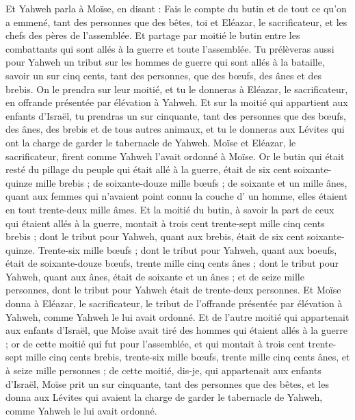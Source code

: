 \begin{multicols}{2}
Et Yahweh parla à Moïse, en disant :
Fais le compte du butin et de tout ce qu'on a emmené, tant des personnes que des bêtes, toi et Eléazar, le sacrificateur, et les chefs des pères de l'assemblée.
Et partage par moitié le butin entre les combattants qui sont allés à la guerre et toute l'assemblée.
Tu prélèveras aussi pour Yahweh un tribut sur les hommes de guerre qui sont allés à la bataille, savoir un sur cinq cents, tant des personnes, que des bœufs, des ânes et des brebis.
On le prendra sur leur moitié, et tu le donneras à Eléazar, le sacrificateur, en offrande présentée par élévation à Yahweh.
Et sur la moitié qui appartient aux enfants d'Israël, tu prendras un sur cinquante, tant des personnes que des bœufs, des ânes, des brebis et de tous autres animaux, et tu le donneras aux Lévites qui ont la charge de garder le tabernacle de Yahweh.
Moïse et Eléazar, le sacrificateur, firent comme Yahweh l'avait ordonné à Moïse.
Or le butin qui était resté du pillage du peuple qui était allé à la guerre, était de six cent soixante-quinze mille brebis ;
de soixante-douze mille bœufs ;
de soixante et un mille ânes,
quant aux femmes qui n'avaient point connu la couche d' un homme, elles étaient en tout trente-deux mille âmes.
Et la moitié du butin, à savoir la part de ceux qui étaient allés à la guerre, montait à trois cent trente-sept mille cinq cents brebis ;
dont le tribut pour Yahweh, quant aux brebis, était de six cent soixante-quinze.
Trente-six mille bœufs ; dont le tribut pour Yahweh, quant aux boeufs, était de soixante-douze bœufs,
trente mille cinq cents ânes ; dont le tribut pour Yahweh, quant aux ânes, était de soixante et un ânes ;
et de seize mille personnes, dont le tribut pour Yahweh était de trente-deux personnes.
Et Moïse donna à Eléazar, le sacrificateur, le tribut de l'offrande présentée par élévation à Yahweh, comme Yahweh le lui avait ordonné.
Et de l'autre moitié qui appartenait aux enfants d'Israël, que Moïse avait tiré des hommes qui étaient allés à la guerre ;
or de cette moitié qui fut pour l'assemblée, et qui montait à trois cent trente-sept mille cinq cents brebis,
trente-six mille bœufs,
trente mille cinq cents ânes,
et à seize mille personnes ;
de cette moitié, dis-je, qui appartenait aux enfants d'Israël, Moïse prit un sur cinquante, tant des personnes que des bêtes, et les donna aux Lévites qui avaient la charge de garder le tabernacle de Yahweh, comme Yahweh le lui avait ordonné.

\end{multicols}
